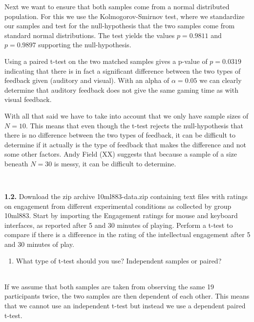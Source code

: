 Next we want to ensure that both samples come from a normal distributed population. For this we use the Kolmogorov-Smirnov test, where we standardize our samples and test for the null-hypothesis that the two samples come from standard normal distributions. The test yields the values $p=0.9811$ and $p=0.9897$ supporting the null-hypothesis.

Using a paired t-test on the two matched samples gives a p-value of $p=0.0319$ indicating that there is in fact a significant difference between the two types of feedback given (auditory and visual). With an alpha of $\alpha=0.05$ we can clearly determine that auditory feedback does not give the same gaming time as with visual feedback.

With all that said we have to take into account that we only have sample sizes of $N=10$. This means that even though the t-test rejects the null-hypothesis that there is no difference between the two types of feedback, it can be difficult to determine if it actually is the type of feedback that makes the difference and not some other factors. Andy Field (XX) suggests that because a sample of a size beneath $N=30$ is messy, it can be difficult to determine.

\hspace{0pt} \\
\noindent\colorbox{light-gray}{\begin{minipage}{0.98\textwidth}
\textbf{1.2.} Download the zip archive 10ml883-data.zip containing text files with ratings on engagement from different experimental conditions as collected by group 10ml883. Start by importing the Engagement ratings for mouse and keyboard interfaces, as reported after 5 and 30 minutes of playing. Perform a t-test to compare if there is a difference in the rating of the intellectual engagement after 5 and 30 minutes of play.
\end{minipage}}

\noindent\colorbox{lighter-gray}{\begin{minipage}{0.98\textwidth}
\begin{enumerate}[label=\textbf{(\arabic*)}]\setcounter{enumi}{0}
	\item What type of t-test should you use? Independent samples or paired?
\end{enumerate}\end{minipage}}

\hspace{0pt} \\
If we assume that both samples are taken from observing the same 19 participants twice, the two samples are then dependent of each other. This means that we cannot use an independent t-test but instead we use a dependent paired t-test.

